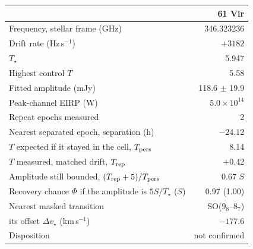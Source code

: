 \begin{tabular}{@{}>{\raggedright\arraybackslash}p{}@{~~}r@{}}
\hline
 & 61 Vir \\
\hline
Frequency, stellar frame (GHz) & 346.323236 \\
Drift rate (Hz\,s$^{-1}$) & $+3182$ \\
$T_\star$ & 5.947 \\
Highest control $T$ & 5.58 \\
Fitted amplitude (mJy) & 118.6 $\pm$ 19.9 \\
Peak-channel EIRP (W) & $5.0 \times 10^{14}$ \\
Repeat epochs measured & 2 \\
Nearest separated epoch, separation (h) & $-24.12$ \\
$T$ expected if it stayed in the cell, $T_{\rm pers}$ & 8.14 \\
$T$ measured, matched drift, $T_{\rm rep}$ & $+0.42$ \\
Amplitude still bounded, $(T_{\rm rep}+5)/T_{\rm pers}$ & 0.67 $S$ \\
Recovery chance $\Phi$ if the amplitude is $5S/T_\star$ ($S$) & 0.97 (1.00) \\
Nearest masked transition & SO($9_{8}$--$8_{7}$) \\
\quad its offset $\Delta v_\star$ (km\,s$^{-1}$) & $-177.6$ \\
Disposition & not confirmed \\
\hline
\end{tabular}
